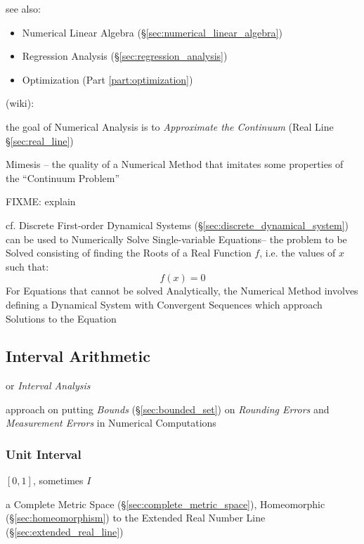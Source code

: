 see also:
\begin{itemize}
  \item Numerical Linear Algebra (\S\ref{sec:numerical_linear_algebra})
  \item Regression Analysis (\S\ref{sec:regression_analysis})
  \item Optimization (Part \ref{part:optimization})
\end{itemize}

(wiki):

the goal of Numerical Analysis is to \emph{Approximate the Continuum}
(Real Line \S\ref{sec:real_line})

Mimesis -- the quality of a Numerical Method that imitates some properties of
the ``Continuum Problem''

FIXME: explain

\asterism

\fist cf. Discrete First-order Dynamical Systems
(\S\ref{sec:discrete_dynamical_system}) can be used to Numerically Solve
Single-variable Equations-- the problem to be Solved consisting of finding the
Roots of a Real Function $f$, i.e. the values of $x$ such that:
\[
  f(x) = 0
\]
For Equations that cannot be solved Analytically, the Numerical Method involves
defining a Dynamical System with Convergent Sequences which approach Solutions
to the Equation



\subsection{Interval Arithmetic}\label{sec:interval_arithmetic}

or \emph{Interval Analysis}

approach on putting \emph{Bounds} (\S\ref{sec:bounded_set}) on \emph{Rounding
  Errors} and \emph{Measurement Errors} in Numerical Computations



\subsubsection{Unit Interval}\label{sec:unit_interval}

$[0,1]$, sometimes $I$

a Complete Metric Space (\S\ref{sec:complete_metric_space}),
Homeomorphic (\S\ref{sec:homeomorphism}) to the Extended Real Number
Line (\S\ref{sec:extended_real_line})



